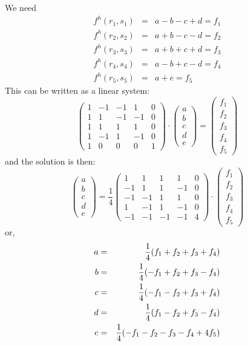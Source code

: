 We need
\begin{eqnarray}
f^h(r_1,s_1) &=& a-b-c+d  =f_1 \\
f^h(r_2,s_2) &=& a+b-c-d  =f_2 \\
f^h(r_3,s_3) &=& a+b+c+d  =f_3 \\
f^h(r_4,s_4) &=& a-b+c-d  =f_4 \\
f^h(r_5,s_5) &=& a      +e=f_5 
\end{eqnarray}
This can be written as a linear system: 
\[
\left(
\begin{array}{ccccc}
1 &-1 &-1 & 1 &0 \\
1 & 1 &-1 &-1 &0 \\
1 & 1 & 1 & 1 &0 \\
1 &-1 & 1 &-1 &0 \\
1 & 0 & 0 & 0 &1 
\end{array}
\right)
\cdot
\left(
\begin{array}{c}
a \\ b \\ c \\ d \\ e
\end{array}
\right)
=
\left(
\begin{array}{c}
f_1 \\ f_2 \\ f_3 \\ f_4 \\ f_5
\end{array}
\right)
\]
and the solution is then:
\[
\left(
\begin{array}{c}
a \\ b \\ c \\ d \\ e
\end{array}
\right)
=
\frac{1}{4}
\left(
\begin{array}{ccccc}
 1 & 1 &  1 & 1 &0\\
-1 & 1 &  1 &-1 &0\\
-1 &-1 &  1 & 1 &0\\
 1 &-1 &  1 &-1 &0\\
-1 &-1 & -1 &-1 &4
\end{array}
\right)
\cdot
\left(
\begin{array}{c}
f_1 \\ f_2 \\ f_3 \\ f_4 \\ f_5
\end{array}
\right)
\]
or, 
\begin{eqnarray}
a &=& \frac{1}{4}( f_1 + f_2 +f_3 +f_4) \nonumber\\
b &=& \frac{1}{4}(-f_1 + f_2 +f_3 -f_4) \nonumber\\
c &=& \frac{1}{4}(-f_1 - f_2 +f_3 +f_4) \nonumber\\
d &=& \frac{1}{4}( f_1 - f_2 +f_3 -f_4) \nonumber\\
e &=& \frac{1}{4}(-f_1 - f_2 -f_3 -f_4 + 4f_5) 
\end{eqnarray}

